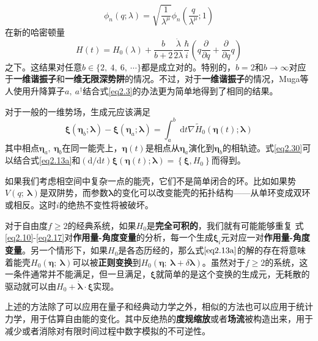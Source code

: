 \begin{equation}
    \phi_{n}(q ; \lambda)=\sqrt{\frac{1}{\lambda^{\mu}}} \phi_{n}\left(\frac{q}{\lambda^{\mu}} ; 1\right)
    \label{eq2.29}
\end{equation}
在新的哈密顿量
\begin{equation}
    H(t)=H_{0}(\lambda)+\frac{b}{b+2} \frac{\dot{\lambda}}{2 \lambda} \frac{\hbar}{i}\left(q \frac{\partial}{\partial q}+\frac{\partial}{\partial q} q\right)
    \label{eq2.29.5}
\end{equation}
之下。这结果对任意$b \in \{ 2,\ 4,\ 6,\ \cdots\}$都是成立对的。特别的，$b=2$和$b \to \infty$对应于\textbf{一维谐振子}和\textbf{一维无限深势阱}的情况。不过，对于\textbf{一维谐振子}的情况，Muga等人使用升降算子$a,\ a^{\dagger}$结合式\eqref{eq2.3}的办法更为简单地得到了相同的结果。\cite{Muga2010}

对于一般的一维势场，生成元应该满足
\begin{equation}
    \boldsymbol{\xi}\left(\bm{\eta}_{b} ; \boldsymbol{\lambda}\right)-\boldsymbol{\xi}\left(\bm{\eta}_{a} ; \boldsymbol{\lambda}\right)=\int_{a}^{b} \mathrm{~d} t \nabla \tilde{H}_{0}(\bm{\eta}(t) ; \boldsymbol{\lambda})
    \label{eq2.30}
\end{equation}
其中相点$\bm{\eta}_{a},\ \bm{\eta}_{b}$在同一能壳上，$\bm{\eta}(t)$是相点从$\bm{\eta}_{a}$演化到$\bm{\eta}_{b}$的相轨迹。式\eqref{eq2.30}可以结合式\eqref{eq2.13a}和$(\mathrm{d} / \mathrm{d} t) \boldsymbol{\xi}(\bm{\eta}(t) ; \boldsymbol{\lambda})=\left\{\boldsymbol{\xi}, H_{0}\right\}$而得到。

如果我们考虑相空间中复杂一点的能壳，它们不是简单闭合的环。比如如果势$V(q;\ \bm{\lambda})$是双阱势，而参数$\bm{\lambda}$的变化可以改变能壳的拓扑结构——从单环变成双环或相反。这时$i$的绝热不变性将被破坏。\cite{Tennyson1986,Cary1986,Hannay1986}

对于自由度$f \geq 2$的经典系统，如果$H_0$是\textbf{完全可积的}\cite{LiuChuan2019}，我们就有可能能够重复
式\eqref{eq2.10}-\eqref{eq2.17}对\textbf{作用量-角度变量}的分析，每一个生成$\bm{\xi}_i$元对应一对\textbf{作用量-角度变量}。另一个情形下，如果$H_0$是各态历经的，那么式$\eqref{eq2.13a}$的解的存在将意味着能壳$H_0 (\bm{\eta};\ \bm{\lambda})$可以被\textbf{正则变换}到$H_0 (\bm{\eta};\ \bm{\lambda}+\delta \bm{\lambda} )$。\cite{Jarzynski1995}虽然对于$f \geq 2$的系统，这一条件通常并不能满足，但一旦满足，$\bm{\xi}$就简单的是这个变换的生成元，无耗散的驱动就可以由$H_0 + \dot{\boldsymbol{\lambda}} \cdot \boldsymbol{\xi}$实现。

上述的方法除了可以应用在量子和经典动力学之外，相似的方法也可以应用于统计力学，用于估算自由能的变化。其中反绝热的\textbf{度规缩放}\cite{Miller2000}或者\textbf{场流}\cite{Vaikuntanathan2008}被构造出来，用于减少或者消除对有限时间过程中数字模拟的不可逆性。

